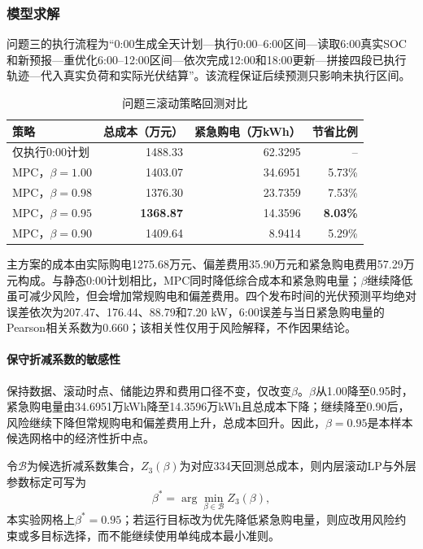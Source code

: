 \documentclass{cumcmthesis}
\begin{document}
\subsubsection{模型求解}

问题三的执行流程为“0:00生成全天计划—执行0:00--6:00区间—读取6:00真实SOC和新预报—重优化6:00--12:00区间—依次完成12:00和18:00更新—拼接四段已执行轨迹—代入真实负荷和实际光伏结算”。该流程保证后续预测只影响未执行区间。

\begin{table}[H]
\centering
\renewcommand\arraystretch{1.2}
\caption{问题三滚动策略回测对比}
\label{tab:q3result}
\begin{tabular}{lrrr}
\toprule
\textbf{策略} & \textbf{总成本（万元）} & \textbf{紧急购电（万kWh）} & \textbf{节省比例}\\
\midrule
仅执行0:00计划 & 1488.33 & 62.3295 & --\\
MPC，$\beta=1.00$ & 1403.07 & 34.6951 & 5.73\%\\
MPC，$\beta=0.98$ & 1376.30 & 23.7359 & 7.53\%\\
MPC，$\beta=0.95$ & \textbf{1368.87} & 14.3596 & \textbf{8.03\%}\\
MPC，$\beta=0.90$ & 1409.64 & 8.9414 & 5.29\%\\
\bottomrule
\end{tabular}
\end{table}

主方案的成本由实际购电1275.68万元、偏差费用35.90万元和紧急购电费用57.29万元构成。与静态0:00计划相比，MPC同时降低综合成本和紧急购电量；$\beta$继续降低虽可减少风险，但会增加常规购电和偏差费用。四个发布时间的光伏预测平均绝对误差依次为207.47、176.44、88.79和7.20 kW，6:00误差与当日紧急购电量的Pearson相关系数为0.660；该相关性仅用于风险解释，不作因果结论。

\paragraph{保守折减系数的敏感性}

保持数据、滚动时点、储能边界和费用口径不变，仅改变$\beta$。$\beta$从1.00降至0.95时，紧急购电量由34.6951万kWh降至14.3596万kWh且总成本下降；继续降至0.90后，风险继续下降但常规购电和偏差费用上升，总成本回升。因此，$\beta=0.95$是本样本候选网格中的经济性折中点。

令$\mathcal B$为候选折减系数集合，$Z_3(\beta)$为对应334天回测总成本，则内层滚动LP与外层参数标定可写为
\begin{equation}
\beta^*=\arg\min_{\beta\in\mathcal B} Z_3(\beta),
\tag{23a}
\end{equation}
本实验网格上$\beta^*=0.95$；若运行目标改为优先降低紧急购电量，则应改用风险约束或多目标选择，而不能继续使用单纯成本最小准则。
\end{document}

